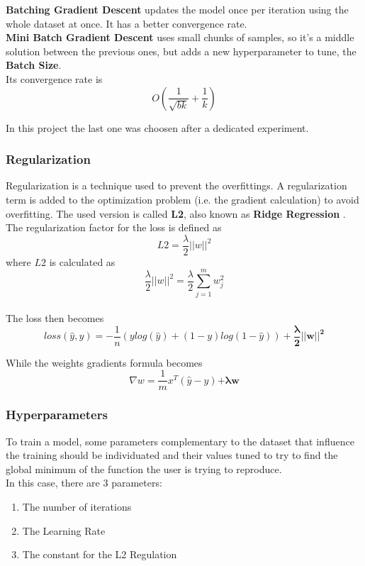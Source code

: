 \documentclass[
	letterpaper, %
	10pt, %
]{class}
\begin{document}
\textbf{Batching Gradient Descent} updates the model once per iteration using the whole dataset at once. It has a better convergence rate.\\

\textbf{Mini Batch Gradient Descent} \cite{batching} uses small chunks of samples, so it's a middle solution between the previous ones, but adds a new hyperparameter to tune, the \textbf{Batch Size}.\\
Its convergence rate is
$$O(\frac{1}{\sqrt{bk}} + \frac{1}{k})$$

In this project the last one was choosen after a dedicated experiment.

\subsubsection{Regularization}
Regularization is a technique used to prevent the overfittings. A regularization term is added to the optimization problem (i.e. the gradient calculation) to avoid overfitting.
The used version is called \textbf{L2}, also known as \textbf{Ridge Regression} \cite{l2}.\\

The regularization factor for the loss is defined as
$$ L2 = \frac{\lambda}{2}||w||^2 $$
where $L2$ is calculated as
$$ \frac{\lambda}{2}||w||^2 = \frac{\lambda}2{\displaystyle\sum_{j=1}^m w_j^2} $$ \\

The loss then becomes
$$ loss(\hat{y}, y) = -\frac{1}{n}(y log(\hat{y}) + (1-y)log(1-\hat{y})) + \boldsymbol{\frac{\lambda}{2}||w||^2} $$

While the weights gradients formula becomes
$$ \nabla w = \frac{1}{m}x^T(\hat{y} - y) \boldsymbol{+ \lambda w} $$

\subsubsection{Hyperparameters}
To train a model, some parameters complementary to the dataset that influence the training should be individuated and their values tuned to try to find the global minimum of the function the user is trying to reproduce.\\
In this case, there are 3 parameters:
\begin{enumerate}
    \item The number of iterations
    \item The Learning Rate
    \item The constant for the L2 Regulation
\end{enumerate}
\end{document}
